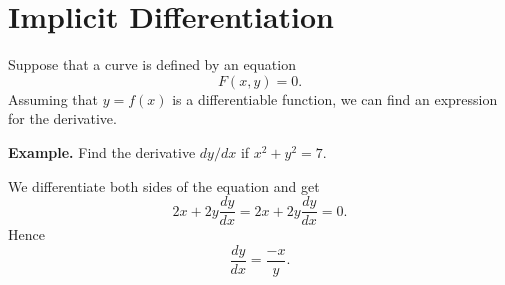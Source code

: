 \section*{Implicit Differentiation}

Suppose that a curve is defined by an equation
\[F(x, y) = 0.\]
Assuming that $y = f(x)$ is a differentiable function, we can find an expression for the derivative.

\textbf{Example.} Find the derivative $dy/dx$ if $x^2 + y^2 = 7$.

We differentiate both sides of the equation and get
\[2x + 2y \frac{dy}{dx} = 2x + 2y \frac{dy}{dx} = 0.\]
Hence
\[\frac{dy}{dx} = \frac{-x}{y}.\]
